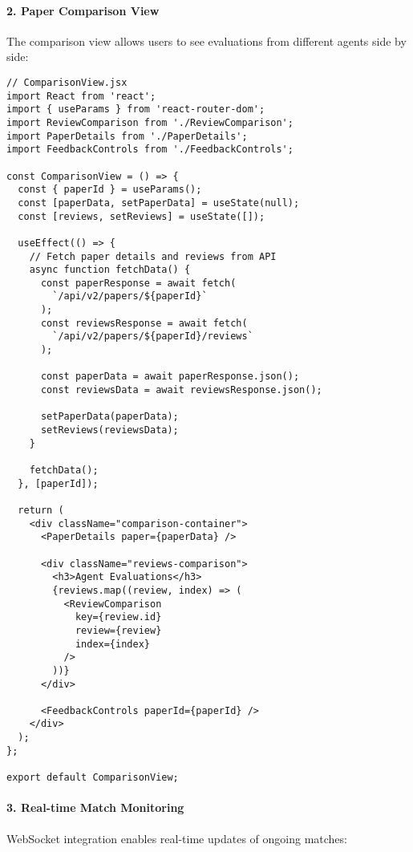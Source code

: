 \documentclass[conference]{IEEEtran}
\begin{document}
\paragraph{2. Paper Comparison View}
The comparison view allows users to see evaluations from different agents side by side:

\begin{verbatim}
// ComparisonView.jsx
import React from 'react';
import { useParams } from 'react-router-dom';
import ReviewComparison from './ReviewComparison';
import PaperDetails from './PaperDetails';
import FeedbackControls from './FeedbackControls';

const ComparisonView = () => {
  const { paperId } = useParams();
  const [paperData, setPaperData] = useState(null);
  const [reviews, setReviews] = useState([]);
  
  useEffect(() => {
    // Fetch paper details and reviews from API
    async function fetchData() {
      const paperResponse = await fetch(
        `/api/v2/papers/${paperId}`
      );
      const reviewsResponse = await fetch(
        `/api/v2/papers/${paperId}/reviews`
      );
      
      const paperData = await paperResponse.json();
      const reviewsData = await reviewsResponse.json();
      
      setPaperData(paperData);
      setReviews(reviewsData);
    }
    
    fetchData();
  }, [paperId]);
  
  return (
    <div className="comparison-container">
      <PaperDetails paper={paperData} />
      
      <div className="reviews-comparison">
        <h3>Agent Evaluations</h3>
        {reviews.map((review, index) => (
          <ReviewComparison 
            key={review.id}
            review={review}
            index={index}
          />
        ))}
      </div>
      
      <FeedbackControls paperId={paperId} />
    </div>
  );
};

export default ComparisonView;
\end{verbatim}

\paragraph{3. Real-time Match Monitoring}
WebSocket integration enables real-time updates of ongoing matches:
\end{document}
